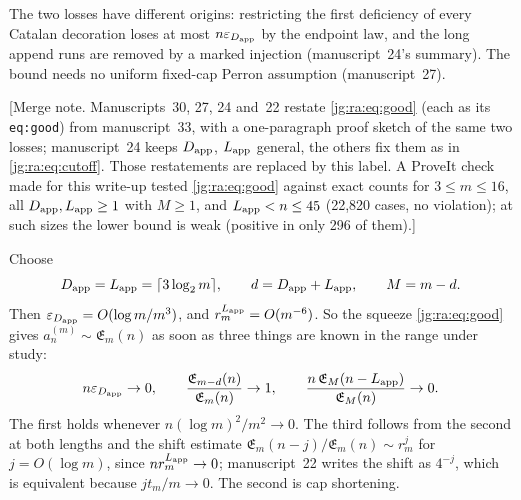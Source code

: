 \documentclass[11pt,a4paper]{article}
\theoremstyle{definition}\newaliascnt{definition}{theorem}
\theoremstyle{remark}\newaliascnt{remark}{theorem}
\newcommand{\eps}{\varepsilon}
\begin{document}
The two losses have different origins: restricting the first deficiency of
every Catalan decoration loses at most $n\eps_{D_{\rm app}}$ by the endpoint
law, and the long append runs are removed by a marked injection
(manuscript~24's summary). The bound needs no uniform fixed-cap Perron
assumption (manuscript~27).

[Merge note. Manuscripts~30, 27, 24 and~22 restate \eqref{jg:ra:eq:good}
(each as its \texttt{eq:good}) from manuscript~33, with a one-paragraph proof
sketch of the same two losses; manuscript~24 keeps $D_{\rm app}$, $L_{\rm app}$
general, the others fix them as in \eqref{jg:ra:eq:cutoff}. Those restatements
are replaced by this label. A ProveIt check made for this write-up tested
\eqref{jg:ra:eq:good} against exact counts for $3\le m\le16$, all
$D_{\rm app},L_{\rm app}\ge1$ with $M\ge1$, and $L_{\rm app}<n\le45$ (22,820
cases, no violation); at such sizes the lower bound is weak (positive in only
296 of them).]

Choose
\begin{equation}\label{jg:ra:eq:cutoff}
 D_{\rm app}=L_{\rm app}=\lceil3\log_2m\rceil,\qquad
 d=D_{\rm app}+L_{\rm app},\qquad M=m-d.
\end{equation}
Then $\eps_{D_{\rm app}}=O(\log m/m^3)$, and $r_m^{L_{\rm app}}=O(m^{-6})$.
So the squeeze \eqref{jg:ra:eq:good} gives $a_n^{(m)}\sim\mathfrak E_m(n)$ as
soon as three things are known in the range under study:
\begin{equation}\label{jg:eq:transfer}
 n\eps_{D_{\rm app}}\to0,\qquad
 \frac{\mathfrak E_{m-d}(n)}{\mathfrak E_m(n)}\to1,\qquad
 \frac{n\,\mathfrak E_M(n-L_{\rm app})}{\mathfrak E_M(n)}\to0.
\end{equation}
The first holds whenever $n(\log m)^2/m^2\to0$. The third follows from the
second at both lengths and the shift estimate
$\mathfrak E_m(n-j)/\mathfrak E_m(n)\sim r_m^j$ for $j=O(\log m)$, since
$nr_m^{L_{\rm app}}\to0$; manuscript~22 writes the shift as $4^{-j}$, which is
equivalent because $jt_m/m\to0$. The second is cap shortening.
\end{document}
